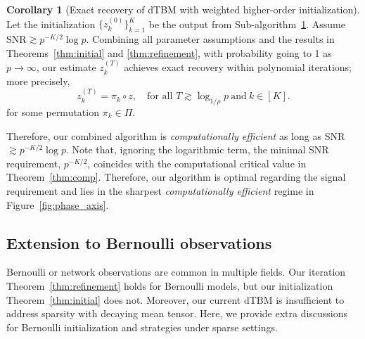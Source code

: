 \documentclass[journal]{IEEEtran}
\theoremstyle{definition}
\newtheorem{cor}{Corollary}
\theoremstyle{definition}
\begin{document}
\begin{cor}[Exact recovery of dTBM with weighted higher-order initialization]  Let the initialization $\{z^{(0)}_k\}_{k = 1}^K$ be the output from Sub-algorithm~\hyperref[alg:main]{1}. Assume $\text{SNR} \gtrsim p^{-K/2} \log p$. Combining {all parameter assumptions and the results in} Theorems~\ref{thm:initial} and \ref{thm:refinement}, with probability going to 1 {as $p \rightarrow \infty$}, our estimate $z^{(T)}_k$ achieves exact recovery within polynomial iterations; more precisely,
\begin{equation}
     z^{(T)}_k = \pi_k \circ z, \quad \text{for all }T\gtrsim \log_{1/\rho} p\  \text{and}\ k \in [K ].
\end{equation}
for some permutation $\pi_k \in \Pi$. 
\end{cor}
Therefore, our combined algorithm is \textit{computationally efficient} as long as SNR $\gtrsim p^{-K/2} \log p$. Note that, ignoring the logarithmic term, the minimal SNR requirement, $p^{-K/2}$, coincides with the computational critical value in Theorem~\ref{thm:comp}. Therefore, our algorithm is optimal regarding the signal requirement and lies in the sharpest \emph{computationally efficient} regime in Figure~\ref{fig:phase_axis}. 

\subsection{Extension to Bernoulli observations}\label{subsec:ber}

Bernoulli or network observations are common in multiple fields. Our iteration Theorem~\ref{thm:refinement} holds for Bernoulli models, but our initialization Theorem~\ref{thm:initial} does not. Moreover, our current dTBM is insufficient to address sparsity with decaying mean tensor. Here, we provide extra discussions for Bernoulli initialization and strategies under sparse settings.
\end{document}
